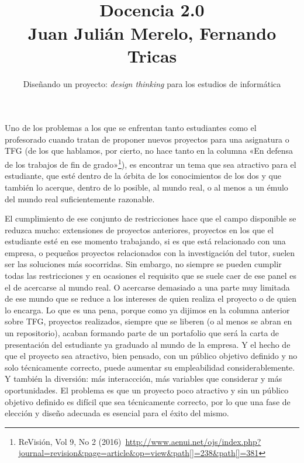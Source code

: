 \documentclass[twoside,10pt]{article}
\title{\ \\ Docencia 2.0\\ \large Juan Julián Merelo, Fernando Tricas}
\author{\LARGE Diseñando un proyecto: {\sl design thinking} para los estudios de informática}
\date{}
\begin{document}
\addtocounter{page}{2}

\maketitle
\vspace*{-5ex}

\begin{multicols}{2}

Uno de los problemas a los que se enfrentan tanto estudiantes como el profesorado
cuando tratan de proponer nuevos proyectos para una asignatura o TFG (de los
que hablamos, por cierto, no hace tanto en la columna «En defensa de los
trabajos de fin de grado»\footnote{ReVisión, Vol 9, No 2
(2016)~\url{http://www.aenui.net/ojs/index.php?journal=revision&page=article&op=view&path[]=238&path[]=381}}), 
es encontrar un tema que sea atractivo para el estudiante, que esté dentro
de la órbita de los conocimientos de los dos y que también
lo acerque, dentro de lo posible, al mundo real, o al menos a un émulo del
mundo real suficientemente razonable. 

El cumplimiento de ese conjunto de restricciones hace que el campo
disponible se reduzca mucho: extensiones de proyectos anteriores,
proyectos en los que el estudiante esté en ese momento trabajando, si
es que está relacionado con una empresa, o pequeños proyectos
relacionados con la investigación del tutor, suelen ser las soluciones
más socorridas.  Sin embargo, no siempre se pueden cumplir todas las
restricciones y en ocasiones el requisito que se suele caer de ese
panel es el de acercarse al mundo real.  O acercarse demasiado a una
parte muy limitada de ese mundo que se reduce a los intereses de quien
realiza el proyecto o de quien lo encarga.  Lo que es una pena,
porque como ya dijimos en la columna anterior sobre TFG, proyectos
realizados, siempre que se liberen (o al menos se abran en un
repositorio), acaban formando parte de un portafolio que será la carta
de presentación del estudiante ya graduado al mundo de la empresa.  Y
el hecho de que el proyecto sea atractivo, bien pensado, con un
público objetivo definido y no solo técnicamente correcto, puede
aumentar su empleabilidad considerablemente.  Y también la diversión:
más interaccción, más variables que considerar y más oportunidades.
El problema es que un proyecto poco atractivo y sin un público
objetivo definido es difícil que sea técnicamente correcto, por lo
que una fase de elección y diseño adecuada es esencial para el éxito
del mismo.


\end{multicols}
\end{document}
